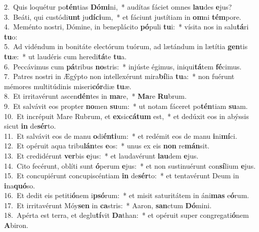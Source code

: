 {2.~}Quis loquétur po\textbf{tén}tias \textbf{Dó}\textbf{mi}ni,~* audítas fáciet omnes \textbf{lau}des \textbf{e}jus?\\
{3.~}Beáti, qui custódi\textbf{unt} ju\textbf{dí}\textbf{ci}um,~* et fáciunt justítiam in \textbf{om}ni \textbf{tém}pore.\\
{4.~}Meménto nostri, Dómine, in beneplácito \textbf{pó}puli \textbf{tu}i:~* vísita nos in salu\textbf{tá}ri \textbf{tu}o:\\
{5.~}Ad vidéndum in bonitáte electórum tuórum, ad lætándum in lætítia \textbf{gen}tis \textbf{tu}æ:~* ut laudéris cum heredi\textbf{tá}te \textbf{tu}a.\\
{6.~}Peccávimus cum \textbf{pá}tribus \textbf{no}stris:~* injúste égimus, iniqui\textbf{tá}tem \textbf{fé}cimus.\\
{7.~}Patres nostri in Ægýpto non intellexérunt mira\textbf{bí}lia \textbf{tu}a:~* non fuérunt mémores multitúdinis miseri\textbf{cór}diæ \textbf{tu}æ.\\
{8.~}Et irritavérunt ascen\textbf{dén}tes in \textbf{ma}re,~* \textbf{Ma}re \textbf{Ru}brum.\\
{9.~}Et salvávit eos propter \textbf{no}men \textbf{su}um:~* ut notam fáceret po\textbf{tén}tiam \textbf{su}am.\\
{10.~}Et incrépuit Mare Rubrum, et \textbf{ex}sic\textbf{cá}\textbf{tum} est,~* et dedúxit eos in abýssis sicut \textbf{in} de\textbf{sér}to.\\
{11.~}Et salvávit eos de manu \textbf{o}di\textbf{én}\textbf{ti}um:~* et redémit eos de manu \textbf{i}ni\textbf{mí}ci.\\
{12.~}Et opéruit aqua tribu\textbf{lán}tes \textbf{e}os:~* unus ex eis \textbf{non} re\textbf{mán}sit.\\
{13.~}Et credidérunt \textbf{ver}bis \textbf{e}jus:~* et laudavérunt \textbf{lau}dem \textbf{e}jus.\\
{14.~}Cito fecérunt, oblíti sunt \textbf{ó}perum \textbf{e}jus:~* et non sustinuérunt con\textbf{sí}lium \textbf{e}jus.\\
{15.~}Et concupiérunt concupiscéntiam \textbf{in} de\textbf{sér}to:~* et tentavérunt Deum in \textbf{i}na\textbf{quó}so.\\
{16.~}Et dedit eis petiti\textbf{ó}nem i\textbf{psó}rum:~* et misit saturitátem in áni\textbf{mas} e\textbf{ó}rum.\\
{17.~}Et irritavérunt Móy\textbf{sen} in \textbf{ca}stris:~* Aaron, \textbf{san}ctum \textbf{Dó}mini.\\
{18.~}Apérta est terra, et deglu\textbf{tí}vit \textbf{Da}than:~* et opéruit super congregati\textbf{ó}nem \textbf{A}biron.\\
